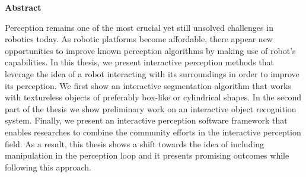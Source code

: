 \clearemptydoublepage
{}
{}

\vspace*{1cm}
\begin{center}
{\Large \bf Abstract}
\end{center}
\vspace{1cm}

Perception remains one of the most crucial yet still unsolved challenges in robotics today. As robotic platforms become affordable, there appear new opportunities to improve known perception algorithms by making use of robot's capabilities. In this thesis, we present interactive perception methods that leverage the idea of a robot interacting with its surroundings in order to improve its perception.  We first show an interactive segmentation algorithm that works with textureless objects of preferably box-like or cylindrical shapes. In the second part of the thesis we show preliminary work on an interactive object recognition system. Finally, we present an interactive perception software framework that enables researches to combine the community efforts in the interactive perception field. As a result, this thesis shows a shift towards the idea of including manipulation in the perception loop and it presents promising outcomes while following this approach.





